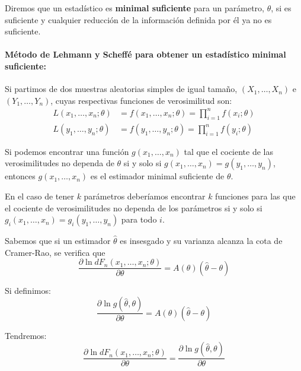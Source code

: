 \begin{definicion}
Diremos que un estad\'istico es \textbf{minimal suficiente} para un par\'ametro, $\theta$, si es suficiente y cualquier reducci\'on de la informaci\'on definida por \'el ya no es suficiente.
\end{definicion}

\paragraph{M\'etodo de Lehmann y Scheff\'e para obtener un estad\'istico minimal suficiente:}
Si partimos de dos muestras aleatorias simples de igual tama\~no, $(X_1,\ldots,X_n)$ e $(Y_1,\ldots,Y_n)$, cuyas respectivas funciones de verosimilitud son:
\begin{align*}
L(x_1,\ldots,x_n;\theta)&=f(x_1,\ldots,x_n;\theta)=\prod_{i=1}^nf(x_i;\theta) \\
L(y_1,\ldots,y_n;\theta)&=f(y_1,\ldots,y_n;\theta)=\prod_{i=1}^nf(y_i;\theta)
\end{align*}

Si podemos encontrar una funci\'on $g(x_1,\ldots,x_n)$ tal que el cociente de las verosimilitudes no dependa de $\theta$ si y solo si $g(x_1,\ldots,x_n)=g(y_1,\ldots,y_n)$, entonces $g(x_1,\ldots,x_n)$ es el estimador minimal suficiente de $\theta$.

En el caso de tener $k$ par\'ametros deber\'iamos encontrar $k$ funciones para las que el cociente de verosimilitudes no dependa de los par\'ametros si y solo si $g_i(x_1,\ldots,x_n)=g_i(y_1,\ldots,y_n)$ para todo $i$.


Sabemos que si un estimador $\hat{\theta}$ es insesgado y su varianza alcanza la cota de Cramer-Rao, se verifica que 
\begin{equation*}
\frac{\partial\ln{dF_n(x_1,\ldots,x_n;\theta)}}{\partial\theta}=A(\theta)(\hat{\theta}-\theta)
\end{equation*}

Si definimos:
\begin{equation*}
\frac{\partial\ln{g(\hat{\theta},\theta)}}{\partial\theta}=A(\theta)(\hat{\theta}-\theta)
\end{equation*}

Tendremos:
\begin{equation*}
\frac{\partial\ln{dF_n(x_1,\ldots,x_n;\theta)}}{\partial\theta}=\frac{\partial\ln{g(\hat{\theta},\theta)}}{\partial\theta}
\end{equation*}

